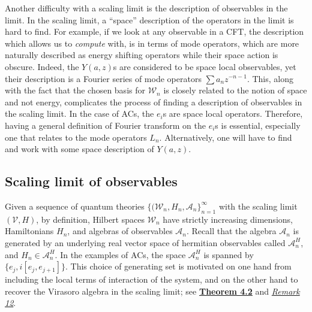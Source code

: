 \documentclass[twoside,11pt,titlepage]{amsart}
\renewcommand{\=}[1]{\stackrel{#1}{=}} %
\theoremstyle{definition}
\theoremstyle{remark}
\begin{document}
Another difficulty with a scaling limit is the description of observables in the limit. In the scaling limit, a ``space'' description of the operators in the limit is hard to find. For example, if we look at any observable in a CFT, the description which allows us to \textit{compute} with, is in terms of mode operators, which are more naturally described as energy shifting operators while their space action is obscure. Indeed, the $Y(a,z)$s are considered to be space local observables, yet their description is a Fourier series of mode operators $\sum a_nz^{-n-1}$. This, along with the fact that the chosen basis for $\mathcal{W}_n$ is closely related to the notion of space and not energy, complicates the process of finding a description of observables in the scaling limit. In the case of ACs, the $e_i$s are space local operators. Therefore, having a general definition of Fourier transform on the $e_i$s is essential, especially one that relates to the mode operators $L_n$. Alternatively, one will have to find and work with some space description of $Y(a,z)$.


\subsection{Scaling limit of observables}\label{2.2}

\hfill \break
Given a sequence of quantum theories $\{(\mathcal{W}_n,H_n,\mathcal{A}_n\}_{n=1}^{\infty}$ with the scaling limit $(\mathcal{V},H)$, by definition, Hilbert spaces $\mathcal{W}_n$ have strictly increasing dimensions,  Hamiltonians $H_n$, and algebras of observables $\mathcal{A}_n$. Recall that the algebra $\mathcal{A}_n$ is generated by an underlying real vector space of hermitian observables called $\mathcal{A}_n^H$, and $H_n \in \mathcal{A}_n^H$. In the examples of ACs, the space $\mathcal{A}_n^H$ is spanned by $\{e_j,i[e_j,e_{j+1}]\}$. This choice of generating set is motivated on one hand from including the local terms of interaction of the system, and on the other hand to recover the Virasoro algebra in the scaling limit; see \hyperref[thm4.2]{\textbf{Theorem 4.2}} and \hyperref[rmk12]{\textit{Remark 12}}. 
\end{document}
